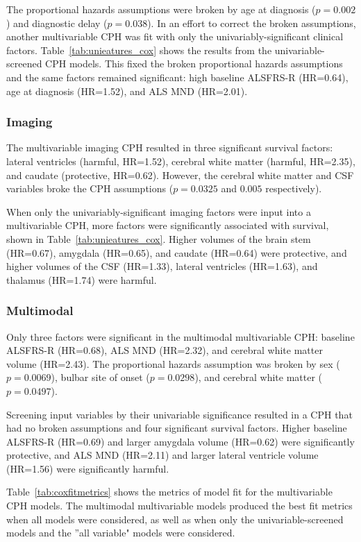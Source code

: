 The proportional hazards assumptions were broken by age at diagnosis ($p=0.002$) and diagnostic delay ($p=0.038$).
In an effort to correct the broken assumptions, another multivariable CPH was fit with only the univariably-significant clinical factors.
Table~\ref{tab:unieatures_cox} shows the results from the univariable-screened CPH models.
This fixed the broken proportional hazards assumptions and the same factors remained significant: high baseline ALSFRS-R (HR=0.64), age at diagnosis (HR=1.52), and ALS MND (HR=2.01).


\subsubsection{Imaging}
The multivariable imaging CPH resulted in three significant survival factors: lateral ventricles (harmful, HR=1.52), cerebral white matter (harmful, HR=2.35), and caudate (protective, HR=0.62).
However, the cerebral white matter and CSF variables broke the CPH assumptions ($p=0.0325$ and $0.005$ respectively).

When only the univariably-significant imaging factors were input into a multivariable CPH, more factors were significantly associated with survival, shown in Table~\ref{tab:unieatures_cox}.
Higher volumes of the brain stem (HR=0.67), amygdala (HR=0.65), and caudate (HR=0.64) were protective, and higher volumes of the CSF (HR=1.33), lateral ventricles (HR=1.63), and thalamus (HR=1.74) were harmful.

\subsubsection{Multimodal}
Only three factors were significant in the multimodal multivariable CPH: baseline ALSFRS-R (HR=0.68), ALS MND (HR=2.32), and cerebral white matter volume (HR=2.43).
The proportional hazards assumption was broken by sex ($p=0.0069$), bulbar site of onset ($p=0.0298$), and cerebral white matter ($p=0.0497$).

Screening input variables by their univariable significance resulted in a CPH that had no broken assumptions and four significant survival factors.
Higher baseline ALSFRS-R (HR=0.69) and larger amygdala volume (HR=0.62) were significantly protective, and ALS MND (HR=2.11) and larger lateral ventricle volume (HR=1.56) were significantly harmful.

Table~\ref{tab:coxfitmetrics} shows the metrics of model fit for the multivariable CPH models.
The multimodal multivariable models produced the best fit metrics when all models were considered, as well as when only the univariable-screened models and the ''all variable" models were considered.

